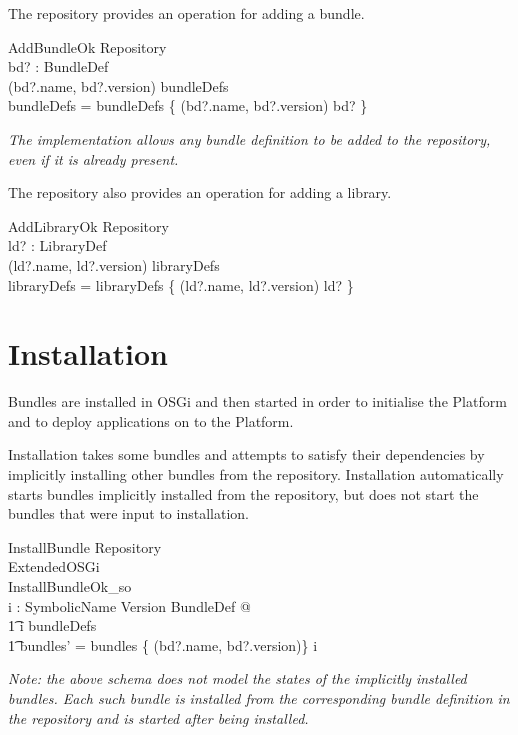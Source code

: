 \documentclass[a4paper]{article}
\begin{document}
The repository provides an operation for adding a bundle.
\begin{schema}{AddBundleOk}
 \Delta Repository \\
 bd? : BundleDef \\
\where
 (bd?.name, bd?.version) \notin \dom bundleDefs \\
 bundleDefs = bundleDefs \cup \{ (bd?.name, bd?.version) \mapsto bd? \} \\
\end{schema}

\textit{The implementation allows any bundle definition to be added to the
repository, even if it is already present.}

The repository also provides an operation for adding a library.
\begin{schema}{AddLibraryOk}
 \Delta Repository \\
 ld? : LibraryDef \\
\where
 (ld?.name, ld?.version) \notin \dom libraryDefs \\
 libraryDefs = libraryDefs \cup \{ (ld?.name, ld?.version) \mapsto ld? \} \\
\end{schema}

\clearpage
\section{Installation}
\label{cha:installation}

Bundles are installed in OSGi and then started in order to initialise the
Platform and to deploy applications on to the Platform.

Installation takes some bundles and attempts to satisfy their dependencies by
implicitly installing other bundles from the repository. Installation automatically starts
bundles implicitly installed from the repository, but does not start the
bundles that were input to installation.
\begin{schema}{InstallBundle}
 \Xi Repository \\
 \Delta ExtendedOSGi \\
 InstallBundleOk\_so \\
\where
 \exists i :  SymbolicName \cross Version \pinj BundleDef @ \\
\t1 i \subseteq bundleDefs \land \\
\t1 \dom bundles' = \dom bundles \cup \{ (bd?.name, bd?.version)\} \cup \dom i \\
\end{schema}
\textit{Note: the above schema does not model the states of the implicitly installed
bundles. Each such bundle is installed from the corresponding bundle definition
in the repository and is started after being installed.}
\end{document}

